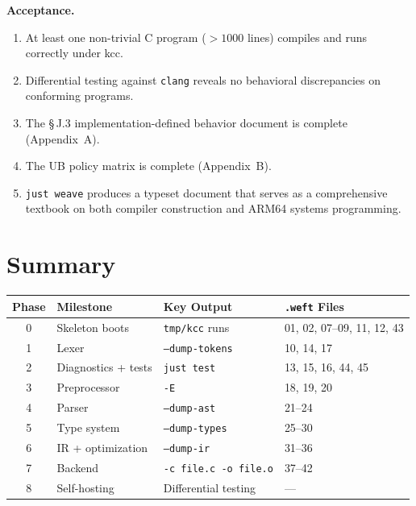 \documentclass[11pt,a4paper,twoside,openright,DIV=15]{scrbook}
\theoremstyle{definition}
\theoremstyle{plain}
\theoremstyle{remark}
\newcommand{\stdref}[1]{\S\,#1}
\newcommand{\kcc}{\textsf{kcc}}
\begin{document}
\textbf{Acceptance.}
\begin{enumerate}
\item At least one non-trivial C program (${}>1000$ lines)
      compiles and runs correctly under \kcc{}.
\item Differential testing against \texttt{clang} reveals no
      behavioral discrepancies on conforming programs.
\item The \stdref{J.3} implementation-defined behavior document
      is complete (Appendix~A).
\item The UB policy matrix is complete (Appendix~B).
\item \texttt{just weave} produces a typeset document that
      serves as a comprehensive textbook on both compiler
      construction and ARM64 systems programming.
\end{enumerate}

\section{Summary}
\label{sec:roadmap-summary}

\begin{center}
\begin{tabular}{clll}
\hline
Phase & Milestone & Key Output & \texttt{.weft} Files \\
\hline
0 & Skeleton boots        & \texttt{tmp/kcc} runs        & 01, 02, 07--09, 11, 12, 43 \\
1 & Lexer                 & \texttt{--dump-tokens}        & 10, 14, 17 \\
2 & Diagnostics + tests   & \texttt{just test}            & 13, 15, 16, 44, 45 \\
3 & Preprocessor          & \texttt{-E}                   & 18, 19, 20 \\
4 & Parser                & \texttt{--dump-ast}           & 21--24 \\
5 & Type system           & \texttt{--dump-types}         & 25--30 \\
6 & IR + optimization     & \texttt{--dump-ir}            & 31--36 \\
7 & Backend               & \texttt{-c file.c -o file.o}  & 37--42 \\
8 & Self-hosting          & Differential testing          & --- \\
\hline
\end{tabular}
\end{center}
\end{document}
